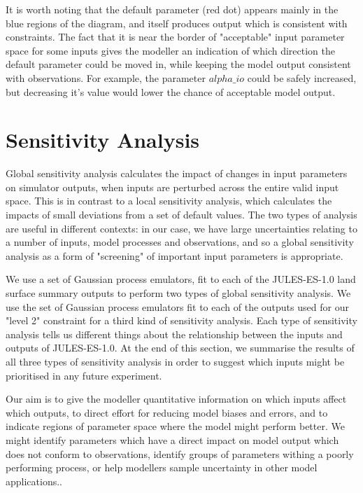 \documentclass[gmd, manuscript]{copernicus}
\begin{document}
It is worth noting that the default parameter (red dot) appears mainly in the blue regions of the diagram, and itself produces output which is consistent with constraints. The fact that it is near the border of "acceptable" input parameter space for some inputs gives the modeller an indication of which direction the default parameter could be moved in, while keeping the model output consistent with observations. For example, the parameter $alpha\_io$ could be safely increased, but decreasing it's value would lower the chance of acceptable model output.

\section{Sensitivity Analysis}\label{sec:sensitivity_analysis}

Global sensitivity analysis calculates the impact of changes in input parameters on simulator outputs, when inputs are perturbed across the entire valid input space. This is in contrast to a local sensitivity analysis, which calculates the impacts of small deviations from a set of default values. The two types of analysis are useful in different contexts: in our case, we have large uncertainties relating to a number of inputs, model processes and observations, and so a global sensitivity analysis as a form of "screening" of important input parameters is appropriate.

We use a set of Gaussian process emulators, fit to each of the JULES-ES-1.0 land surface summary outputs to perform two types of global sensitivity analysis. We use the set of Gaussian process emulators fit to each of the outputs used for our "level 2" constraint for a third kind of sensitivity analysis. Each type of sensitivity analysis tells us different things about the relationship between the inputs and outputs of JULES-ES-1.0. At the end of this section, we summarise the results of all three types of sensitivity analysis in order to suggest which inputs might be prioritised in any future experiment.

Our aim is to give the modeller quantitative information on which inputs affect which outputs, to direct effort for reducing model biases and errors, and to indicate regions of parameter space where the model might perform better. We might identify parameters which have a direct impact on model output which does not conform to observations, identify groups of parameters withing a poorly performing process, or help modellers sample uncertainty in other model applications..
\end{document}
